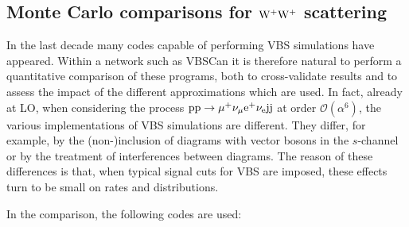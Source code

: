 \subsection{Monte Carlo comparisons for ${\rm W^+ W^+}$ scattering}
In the last decade many codes capable of performing VBS simulations have appeared.
Within a network such as VBSCan it is therefore natural to perform 
a quantitative comparison of these programs, both to cross-validate results and to assess the impact of the different approximations which are used.
In fact, already at LO, when considering the process ${\rm p}{\rm p}\to\mu^+\nu_\mu{\rm e}^+\nu_{\rm e}{\rm j}{\rm j}$ at order $\mathcal O (\alpha^6)$, the various implementations of VBS simulations are different.
They differ, for example,
by the (non-)inclusion of diagrams with vector bosons in the $s$-channel or by the treatment of interferences between diagrams.
The reason of these differences is that, 
when typical signal cuts for VBS are imposed, these effects turn to be small on rates and distributions.

In the comparison, the following codes are used: 

